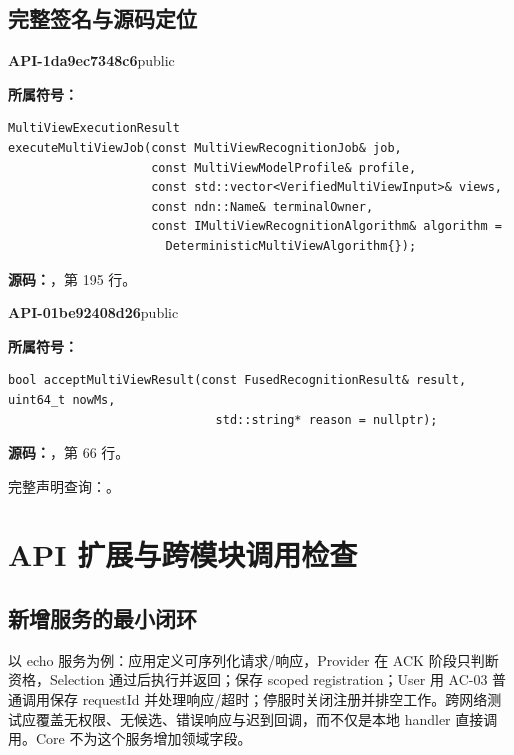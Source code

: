 \subsection{完整签名与源码定位}

\textbf{API-1da9ec7348c6}\quad public\par
\textbf{所属符号：}\par
\begin{Verbatim}[fontsize=\footnotesize,breaklines,breakanywhere]
MultiViewExecutionResult
executeMultiViewJob(const MultiViewRecognitionJob& job,
                    const MultiViewModelProfile& profile,
                    const std::vector<VerifiedMultiViewInput>& views,
                    const ndn::Name& terminalOwner,
                    const IMultiViewRecognitionAlgorithm& algorithm =
                      DeterministicMultiViewAlgorithm{});
\end{Verbatim}
\textbf{源码：}，第 195 行。\par

\textbf{API-01be92408d26}\quad public\par
\textbf{所属符号：}\par
\begin{Verbatim}[fontsize=\footnotesize,breaklines,breakanywhere]
bool acceptMultiViewResult(const FusedRecognitionResult& result, uint64_t nowMs,
                             std::string* reason = nullptr);
\end{Verbatim}
\textbf{源码：}，第 66 行。\par

完整声明查询：。

\section{API 扩展与跨模块调用检查}

\subsection{新增服务的最小闭环}
以 echo 服务为例：应用定义可序列化请求/响应，Provider 在 ACK 阶段只判断资格，Selection 通过后执行并返回；保存 scoped registration；User 用 AC-03 普通调用保存 requestId 并处理响应/超时；停服时关闭注册并排空工作。跨网络测试应覆盖无权限、无候选、错误响应与迟到回调，而不仅是本地 handler 直接调用。Core 不为这个服务增加领域字段。

